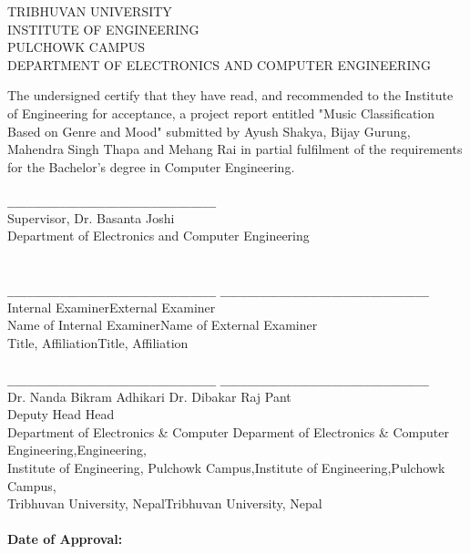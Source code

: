 	\newpage
	
	\begin{center}	TRIBHUVAN UNIVERSITY\\
     INSTITUTE OF ENGINEERING\\
     PULCHOWK CAMPUS\\
     DEPARTMENT OF ELECTRONICS AND COMPUTER ENGINEERING\\
    \end{center}
    \noindent The undersigned certify that they have read, and recommended to the Institute of Engineering for acceptance, a project report entitled "Music Classification Based on Genre and Mood" submitted by Ayush Shakya, Bijay Gurung, Mahendra Singh Thapa and Mehang Rai in partial fulfilment of the requirements for the Bachelor’s degree in Computer Engineering. \\\\
    \noindent
    \verb|________________________________|\\
    Supervisor, Dr. Basanta Joshi\\
    Department of Electronics and Computer Engineering\\\\
    \\
    \verb|________________________________| \hspace{10mm}\verb|________________________________|\\
    Internal Examiner\hspace{50mm}External Examiner\\
    Name of Internal Examiner\hspace{34mm}Name of External Examiner\\
    Title, Affiliation\hspace{53mm}Title, Affiliation\\ 
    \\
    \verb|________________________________| \hspace{10mm}\verb|________________________________|\\
    Dr. Nanda Bikram Adhikari \hspace{33mm}Dr. Dibakar Raj Pant\\
    Deputy Head \hspace{58mm}Head \\
    Department of Electronics \& Computer \hspace{13mm} Deparment of Electronics \& Computer\\ 
    Engineering,\hspace{60mm}Engineering,\\
    Institute of Engineering, Pulchowk Campus,\hspace{6mm}Institute of Engineering,Pulchowk Campus,\\
    Tribhuvan University, Nepal\hspace{33mm}Tribhuvan University, Nepal\\\\

    
    \noindent \textbf{Date of Approval:}
